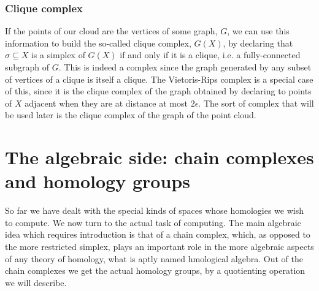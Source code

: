 \documentclass[../main.tex]{subfiles}
\begin{document}
\subsubsection{Clique complex} \label{sec:clique complex}
If the points of our cloud are the vertices of some graph, \( G \), we can use this
information to build the so-called clique complex, \( G(X) \), by declaring that \( \sigma
\subseteq X \) is a simplex of \( G(X) \) if and only if it is a clique, i.e. a
fully-connected subgraph of \( G \). This is indeed a complex since the graph generated by
any subset of vertices of a clique is itself a clique. The Vietoris-Rips complex is a
special case of this, since it is the clique complex of the graph obtained by declaring to
points of \( X \) adjacent when they are at distance at most \( 2\epsilon \).  The sort of
complex that will be used later is the clique complex of the \MKNN graph of the point
cloud. 

\section{The algebraic side: chain complexes and homology groups}\label{sec:algebraic
side}
So far we have dealt with the special kinds of spaces whose homologies we wish to compute.
We now turn to the actual task of computing. The main algebraic idea which requires
introduction is that of a chain complex, which, as opposed to the more restricted simplex,
plays an important role in the more algebraic aspects of any theory of homology, what is
aptly named hmological algebra. Out of the chain complexes we get the actual homology
groups, by a quotienting operation we will describe.
\end{document}
